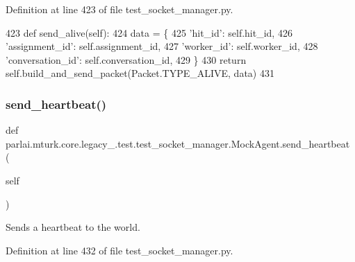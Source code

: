 Definition at line 423 of file test\+\_\+socket\+\_\+manager.\+py.


\begin{DoxyCode}
423     \textcolor{keyword}{def }send\_alive(self):
424         data = \{
425             \textcolor{stringliteral}{'hit\_id'}: self.hit\_id,
426             \textcolor{stringliteral}{'assignment\_id'}: self.assignment\_id,
427             \textcolor{stringliteral}{'worker\_id'}: self.worker\_id,
428             \textcolor{stringliteral}{'conversation\_id'}: self.conversation\_id,
429         \}
430         \textcolor{keywordflow}{return} self.build\_and\_send\_packet(Packet.TYPE\_ALIVE, data)
431 
\end{DoxyCode}
\mbox{\label{classparlai_1_1mturk_1_1core_1_1legacy__2018_1_1test_1_1test__socket__manager_1_1MockAgent_a554bb34a534623af988f14f63a9e6be4}} 
\subsubsection{\texorpdfstring{send\+\_\+heartbeat()}{send\_heartbeat()}}
{\footnotesize\ttfamily def parlai.\+mturk.\+core.\+legacy\+\_.\+test.\+test\+\_\+socket\+\_\+manager.\+Mock\+Agent.\+send\+\_\+heartbeat (\begin{DoxyParamCaption}\item[{}]{self }\end{DoxyParamCaption})}

\begin{DoxyVerb}Sends a heartbeat to the world.
\end{DoxyVerb}
 

Definition at line 432 of file test\+\_\+socket\+\_\+manager.\+py.


